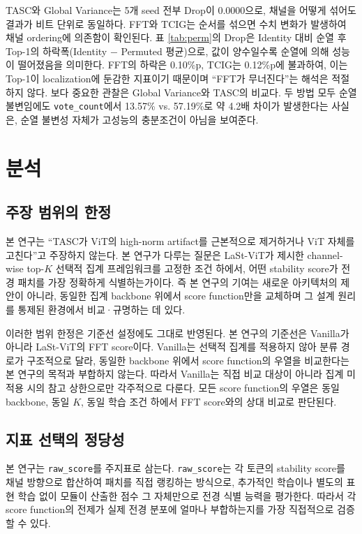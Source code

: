 \documentclass[10pt,twocolumn,letterpaper]{article}
\newcommand{\rawscore}{\texttt{raw\_score}}
\newcommand{\votecount}{\texttt{vote\_count}}
\begin{document}
TASC와 Global Variance는 5개 seed 전부 Drop이 0.0000으로, 채널을 어떻게 섞어도 결과가 비트 단위로 동일하다. FFT와 TCIG는 순서를 섞으면 수치 변화가 발생하여 채널 ordering에 의존함이 확인된다. 표 \ref{tab:perm}의 Drop은 Identity 대비 순열 후 Top-1의 하락폭(Identity $-$ Permuted 평균)으로, 값이 양수일수록 순열에 의해 성능이 떨어졌음을 의미한다. FFT의 하락은 0.10\%p, TCIG는 0.12\%p에 불과하여, 이는 Top-1이 localization에 둔감한 지표이기 때문이며 ``FFT가 무너진다''는 해석은 적절하지 않다. 보다 중요한 관찰은 Global Variance와 TASC의 비교다. 두 방법 모두 순열 불변임에도 \votecount{}에서 13.57\% vs. 57.19\%로 약 4.2배 차이가 발생한다는 사실은, 순열 불변성 자체가 고성능의 충분조건이 아님을 보여준다.

\section{분석}

\subsection{주장 범위의 한정}

본 연구는 ``TASC가 ViT의 high-norm artifact를 근본적으로 제거하거나 ViT 자체를 고친다''고 주장하지 않는다. 본 연구가 다루는 질문은 LaSt-ViT가 제시한 channel-wise top-$K$ 선택적 집계 프레임워크를 고정한 조건 하에서, 어떤 stability score가 전경 패치를 가장 정확하게 식별하는가이다. 즉 본 연구의 기여는 새로운 아키텍처의 제안이 아니라, 동일한 집계 backbone 위에서 score function만을 교체하며 그 설계 원리를 통제된 환경에서 비교·규명하는 데 있다.

이러한 범위 한정은 기준선 설정에도 그대로 반영된다. 본 연구의 기준선은 Vanilla가 아니라 LaSt-ViT의 FFT score이다. Vanilla는 선택적 집계를 적용하지 않아 분류 경로가 구조적으로 달라, 동일한 backbone 위에서 score function의 우열을 비교한다는 본 연구의 목적과 부합하지 않는다. 따라서 Vanilla는 직접 비교 대상이 아니라 집계 미적용 시의 참고 상한으로만 각주적으로 다룬다. 모든 score function의 우열은 동일 backbone, 동일 $K$, 동일 학습 조건 하에서 FFT score와의 상대 비교로 판단된다.

\subsection{지표 선택의 정당성}

본 연구는 \rawscore{}를 주지표로 삼는다. \rawscore{}는 각 토큰의 stability score를 채널 방향으로 합산하여 패치를 직접 랭킹하는 방식으로, 추가적인 학습이나 별도의 표현 학습 없이 모듈이 산출한 점수 그 자체만으로 전경 식별 능력을 평가한다. 따라서 각 score function의 전제가 실제 전경 분포에 얼마나 부합하는지를 가장 직접적으로 검증할 수 있다.
\end{document}
